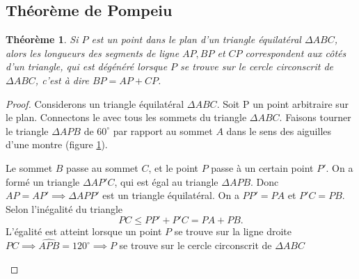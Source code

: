 \documentclass[10pt,a4paper]{article}%
\theoremstyle{theorem}
\newtheorem{theorem}{Théorème}
\theoremstyle{definition}
\begin{document}
			\subsection{Théorème de Pompeiu}
				\begin{theorem}
					Si $P$ est un point dans le plan d'un triangle équilatéral $\Delta ABC$, alors les longueurs des segments de ligne $AP, BP$ et $CP$ correspondent aux côtés d'un triangle, qui est dégénéré lorsque $P$ se trouve sur le cercle circonscrit de $\Delta ABC$, c'est à dire $BP=AP+CP$.
					
				\end{theorem}
			    	\begin{proof}
			    		Considerons un triangle équilatéral $\Delta ABC$. Soit P un point arbitraire sur le plan. Connectons le avec tous les sommets du triangle $\Delta ABC$. Faisons tourner le triangle $\Delta APB$ de $60^\circ$ par rapport au sommet $A$ dans le sens des aiguilles d'une montre (figure \ref{ris1.figure}).
			    		
			    		Le sommet $B$ passe au sommet $C$, et le point $P$ passe à un certain point $P'$. On a formé un triangle $\Delta AP'C$, qui est égal au triangle $\Delta APB$. Donc $AP=AP' \implies \Delta APP'$ est un triangle équilatéral. On a $PP'=PA$ et $P'C=PB$. Selon l'inégalité du triangle 
			    		\[PC\leq PP'+P'C=PA+PB.\]
			    		L'égalité est atteint lorsque un point $P$ se trouve sur la ligne droite $PC \implies \widehat{APB}=120^\circ \implies P$ se trouve sur le cercle circonscrit de $\Delta ABC$
			    		
			    		\begin{figure}[h]
			    			    		
			    		\begin{center}
			    		\end{center}
		    			\caption{}\label{ris1.figure}
		    			\end{figure}
			    		
			   		\end{proof}
		
\end{document}
